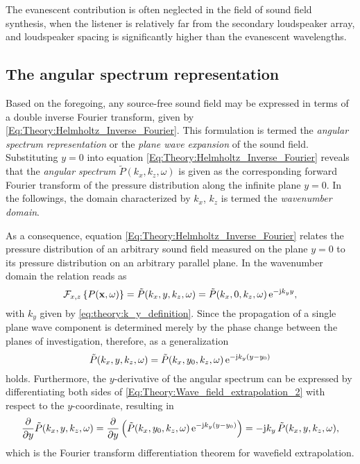%
The evanescent contribution is often neglected in the field of sound field synthesis, when the listener is relatively far from the secondary loudspeaker array, and loudspeaker spacing is significantly higher than the evanescent wavelengths.

%
\subsection{The angular spectrum representation}
\label{Sec:thoery:angular_Spectrum}

Based on the foregoing, any source-free sound field may be expressed in terms of a double inverse Fourier transform, given by \eqref{Eq:Theory:Helmholtz_Inverse_Fourier}.
This formulation is termed the \emph{angular spectrum representation} \cite{Williams1999, Goodman2005, NietoVesp2006, Ahrens2010phd, Ahrens2012} or the \emph{plane wave expansion} \cite{Spors2005} of the sound field.
Substituting $y=0$ into equation \eqref{Eq:Theory:Helmholtz_Inverse_Fourier} reveals that the \emph{angular spectrum} $\tilde{P}(k_x,k_z,\omega)$ is given as the corresponding forward Fourier transform of the pressure distribution along the infinite plane $y=0$.
In the followings, the domain characterized by $k_x$, $k_z$ is termed the \emph{wavenumber domain}.

As a consequence, equation \eqref{Eq:Theory:Helmholtz_Inverse_Fourier} relates the pressure distribution of an arbitrary sound field measured on the plane $y=0$ to its pressure distribution on an arbitrary parallel plane. 
In the wavenumber domain the relation reads as
\begin{equation}
\FT[x,z]{ P(\vx,\omega) } = \tilde{P}(k_x,y,k_z,\omega) = \tilde{P}(k_x,0,k_z,\omega) \, \te^{-\ti k_y y},
\label{Eq:Theory:Wave_field_extrapolation}
\end{equation}
with $k_y$ given by \eqref{eq:theory:k_y_definition}.
Since the propagation of a single plane wave component is determined merely by the phase change between the planes of investigation, therefore, as a generalization
\begin{equation}
\tilde{P}(k_x,y,k_z,\omega) = \tilde{P}(k_x,y_0,k_z,\omega) \, \te^{-\ti k_y ( y - y_0 ) }
\label{Eq:Theory:Wave_field_extrapolation_2}
\end{equation}
holds. Furthermore, the $y$-derivative of the angular spectrum can be expressed by differentiating both sides of \eqref{Eq:Theory:Wave_field_extrapolation_2} with respect to the $y$-coordinate, resulting in
\begin{equation}
\frac{\partial}{\partial y} \tilde{P}(k_x,y,k_z,\omega) = \frac{\partial}{\partial y} \left( \tilde{P}(k_x,y_0,k_z,\omega) \, \te^{-\ti k_y ( y - y_0 ) } \right) = -\ti k_y \, \tilde{P}(k_x,y,k_z,\omega),
\label{eq:Theory:Fourier_diff}
\end{equation}
which is the Fourier transform differentiation theorem for wavefield extrapolation.

